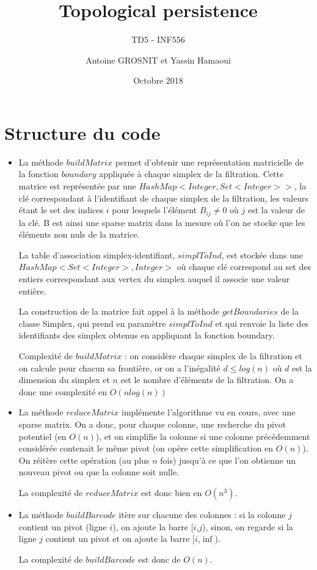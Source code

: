 \documentclass[a4paper,11pt]{article}
\title{Topological persistence}
\author{Antoine GROSNIT et Yassin Hamaoui}
\subtitle{TD5 - INF556}
\date{Octobre 2018}
\begin{document}
\maketitle
\section{Structure du code}

\begin{itemize}
\item La méthode $buildMatrix$ permet d'obtenir une représentation matricielle de la fonction $boundary$ appliquée à chaque simplex de la filtration. Cette matrice est représentée par une $HashMap<Integer, Set<Integer>>$, la clé correspondant à l'identifiant de chaque simplex de la filtration, les valeurs étant le set des indices $i$ pour lesquels l'élément $B_{ij} \neq 0$ où $j$ est la valeur de la clé. B est ainsi une sparse matrix dans la mesure où l'on ne stocke que les éléments non nuls de la matrice.

La table d'association simplex-identifiant, $simplToInd$,  est stockée dans une $HashMap<Set<Integer>, Integer>$ où chaque clé correspond au set des entiers correspondant aux vertex du simplex auquel il associe une valeur entière.

La construction de la matrice fait appel à la méthode $getBoundaries$ de la classe Simplex, qui prend en paramètre  $simplToInd$ et qui renvoie la liste des identifiants des simplex obtenus en appliquant la fonction boundary.

Complexité de $buildMatrix$ : on considère chaque simplex de la filtration et on calcule pour chacun sa frontière, or on a l'inégalité $d \leq log (n)$ où $d$ est la dimension du simplex et $n$ est le nombre d'éléments de la filtration. On a donc une complexité en $O(nlog(n))$\\

\item La méthode $reduceMatrix$ implémente l'algorithme vu en cours, avec une sparse matrix. On a donc, pour chaque colonne, une recherche du pivot potentiel (en $O(n)$), et on simplifie la colonne si une colonne précédemment considérée contenait le même pivot (on opère cette simplification en $O(n)$). On réitère cette opération (au plus $n$ fois) jusqu'à ce que l'on obtienne un nouveau pivot ou que la colonne soit nulle.

La complexité de $reduceMatrix$ est donc bien en $O(n^3)$.\\

\item La méthode $buildBarcode$ itère sur chacune des colonnes : si la colonne $j$ contient un pivot (ligne $i$), on ajoute la barre [$i$,$j$), sinon, on regarde si la ligne $j$ contient un pivot et on ajoute la barre [$i$,$\inf$).

La complexité de $buildBarcode$ est donc de $O(n)$.

\end{itemize}
\end{document}
